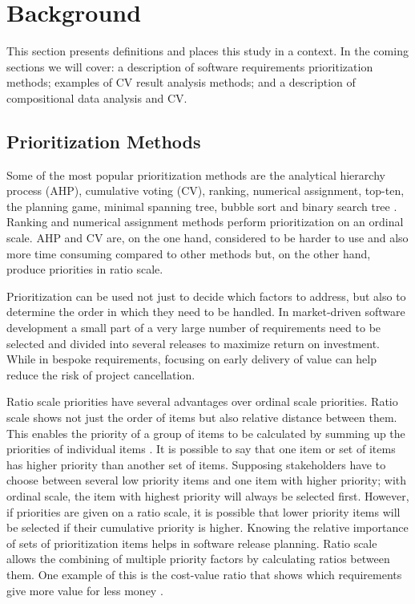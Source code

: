 \section{Background\label{background}}

This section presents definitions and places this study in a context. In the coming sections we will cover: a description of software requirements prioritization methods; examples of CV result analysis methods; and a description of compositional data analysis and CV.

\subsection{Prioritization Methods}

Some of the most popular prioritization methods are the analytical hierarchy
process (AHP), cumulative voting (CV), ranking, numerical assignment,
top-ten, the planning game, minimal spanning tree, bubble sort and binary
search tree \citep{Berander2005,Karlsson1998}. Ranking and numerical
assignment methods perform prioritization on an ordinal scale. AHP and CV
are, on the one hand, considered to be harder to use and also more time 
consuming compared to other methods but, on the other hand, produce 
priorities in ratio scale.

Prioritization can be used not just to decide which factors to address,
but also to determine the order in which they need to be handled. In market-driven 
software development a small part of a very large number of requirements
need to be selected and divided into several releases to maximize return
on investment. While in bespoke requirements, focusing on early delivery
of value can help reduce the risk of project cancellation.

Ratio scale priorities have several advantages over ordinal scale
priorities. Ratio scale shows not just the order of items but also
relative distance between them. This enables the priority of a group of
items to be calculated by summing up the priorities of individual items
\citep{Berander2006a}. It is possible to say that one item or set
of items has higher priority than another set of items. Supposing stakeholders
have to choose between several low priority items and one item with
higher priority; with ordinal scale, the item with highest priority will
always be selected first. However, if priorities are given on a ratio
scale, it is possible that lower priority items will be selected if
their cumulative priority is higher. Knowing the relative importance of
sets of prioritization items helps in software release planning. Ratio
scale allows the combining of multiple priority factors by calculating ratios
between them. One example of this is the cost-value ratio that shows which
requirements give more value for less money \citep{Karlsson1997}.

